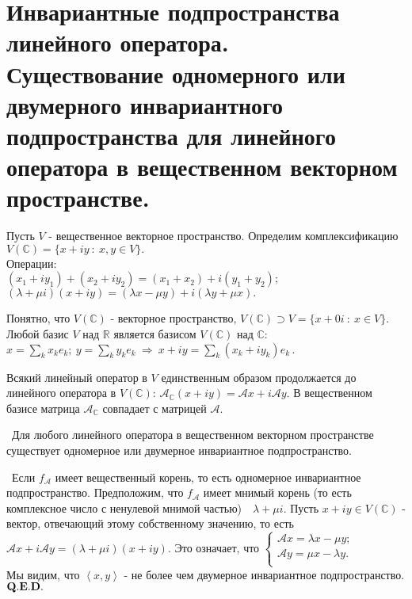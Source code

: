 \documentclass[draft]{article}%
\renewcommand{\c}{\mathbb{C}}
\newcommand{\ab}{\par\noindent}%
\newcommand{\te}{\par\noindent{\bf Теорема.}\ }%
\newcommand{\dok}{\par\noindent{\textsl{Доказательство}.}\ }%
\newcommand{\qed}{\quad${{\bf Q.E.D.}}$}
\newcommand{\lob}[1]{\left\langle#1\right\rangle}%
\newcommand{\op}[1]{$\mathcal{#1}$}
\newcommand{\om}[1]{\mathcal{#1}}
\begin{document}
\section{Инвариантные подпространства линейного оператора.\\ Существование одномерного или двумерного инвариантного подпространства
для линейного оператора в вещественном векторном пространстве.} %
\label{q27}%
Пусть $V$ - вещественное векторное пространство. Определим комплексификацию \\
$V(\c)=\{x+iy\ :\ x,y\in V\}.$ %
\\Операции:\\ $(x_1+iy_1)+(x_2+iy_2)=(x_1+x_2)+i(y_1+y_2);$
\\
$(\lambda+\mu i)(x+iy)=(\lambda x-\mu y)+i(\lambda y+\mu x).$ %
\ab Понятно, что $V(\c)$ - векторное пространство, $V(\c)\supset V=\{x+0i\ :\ x\in V\}.$ %
\\Любой базис $V$ над $\mathbb{R}$ является базисом $V(\c)$ над $\c$:\\
$x=\sum\limits_kx_ke_k;\ y=\sum\limits_ky_ke_k\ \Rightarrow\ x+iy=\sum\limits_k(x_k+iy_k)e_k\,.$ %
\ab Всякий линейный оператор в $V$ единственным образом продолжается до линейного оператора в $V(\c)$:
$\om{A_{\c}}(x+iy)=\om{A}x+i\om{A}y.$ В вещественном базисе матрица $\om{A}_{\c}$ совпадает с матрицей \op{A}. %
\te Для любого линейного оператора в вещественном векторном пространстве существует одномерное или двумерное
инвариантное подпространство. %
\dok Если $f_{\om{A}}$ имеет вещественный корень, то есть одномерное инвариантное подпространство.
Предположим, что $f_{\om{A}}$ имеет мнимый корень (то есть комплексное число с ненулевой мнимой частью)\ \ $\lambda+\mu i.$%
Пусть $x+iy\in V(\c)$ - вектор, отвечающий этому собственному значению, то есть $\om{A}x+i\om{A}y=(\lambda+\mu
i)(x+iy).$ Это означает, что $\left\{%
\begin{array}{ll}
    \om{A}x=\lambda x-\mu y; &  \\
    \om{A}y=\mu x-\lambda y. &  \\
\end{array}%
\right.$ %
\\Мы видим, что $\lob{x,y}$ - не более чем двумерное инвариантное подпространство.\qed
\end{document}
